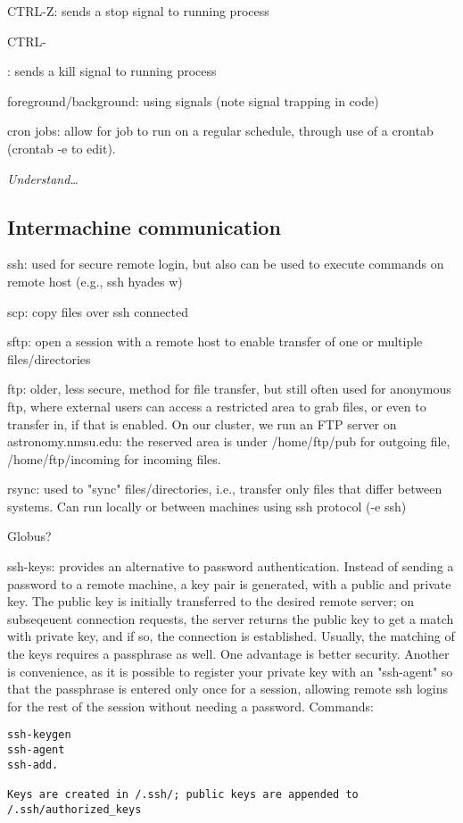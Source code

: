 \documentclass{article}
\newcommand{\test}[1]{%
    \begin{center}
        \colorbox{hl}{\parbox{0.9\textwidth}{\emph{\centering #1}}}
    \end{center}}
\begin{document}
CTRL-Z: sends a stop signal to running process

CTRL-

: sends a kill signal to running process

foreground/background: using signals (note signal trapping in code)

cron jobs: allow for job to run on a regular schedule, through use of
a crontab (crontab -e to edit).

\test{Understand\ldots}

\subsection{Intermachine communication}
ssh: used for secure remote login, but also can be used to execute
commands on remote host (e.g., ssh hyades w)

scp: copy files over ssh connected

sftp: open a session with a remote host to enable transfer of one or
multiple files/directories

ftp: older, less secure, method for file transfer, but still often
used for anonymous ftp, where external users can access a restricted
area to grab files, or even to transfer in, if that is enabled. On our
cluster, we run an FTP server on astronomy.nmsu.edu: the reserved area
is under /home/ftp/pub for outgoing file, /home/ftp/incoming for
incoming files.

rsync: used to "sync" files/directories, i.e., transfer only files
that differ between systems. Can run locally or between machines using
ssh protocol (-e ssh)

Globus?

ssh-keys: provides an alternative to password authentication. Instead
of sending a password to a remote machine, a key pair is generated,
with a public and private key. The public key is initially transferred
to the desired remote server; on subseqeuent connection requests, the
server returns the public key to get a match with private key, and if
so, the connection is established. Usually, the matching of the keys
requires a passphrase as well. One advantage is better security.
Another is convenience, as it is possible to register your private key
with an "ssh-agent" so that the passphrase is entered only once for a
session, allowing remote ssh logins for the rest of the session
without needing a password. Commands:
\begin{verbatim}
ssh-keygen
ssh-agent
ssh-add.

Keys are created in /.ssh/; public keys are appended to /.ssh/authorized_keys
\end{verbatim}
\end{document}
